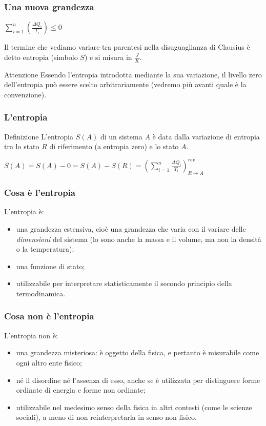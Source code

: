 \documentclass[]{beamer}
\theoremstyle{plain}
\begin{document}
\begin{frame}
  \frametitle{Una nuova grandezza}
  \begin{center}
  $ \sum\limits_{i=1}^n \left( \frac{\Delta Q_i}{T_i} \right) \leq 0 $
  \end{center}
  Il termine che vediamo variare tra parentesi nella disuguaglianza di Clausius è detto \alert<1>{entropia} (simbolo $ S $) e si misura in $ \frac{J}{K} $.{\pause}
  \begin{alertblock}{Attenzione}
  Essendo l'entropia introdotta mediante la sua variazione, il livello zero dell'entropia può essere scelto arbitrariamente (vedremo più avanti quale è la convenzione).    
  \end{alertblock}
\end{frame}

\begin{frame}
  \frametitle{L'entropia}
    \begin{block}{Definizione}
    L'entropia $ S(A) $ di un sistema $ A $ è data dalla variazione di entropia tra lo stato $ R $ di riferimento (a entropia zero) e lo stato $ A $.
    \begin{center}
    $ S(A) = S(A) - 0 = S(A) - S(R) = \left( \sum\limits_{i=1}^n \frac{\Delta Q_i}{T_i}  \right)_{R \rightarrow A}^{rev}  $
    \end{center}
  \end{block}
\end{frame}

\begin{frame}
  \frametitle{Cosa è l'entropia}
  L'entropia è:
  \begin{itemize}
    \item una \alert<1>{grandezza estensiva}, cioè una grandezza che varia con il variare delle \emph{dimensioni} del sistema (lo sono anche la massa e il volume, ma non la densità o la temperatura);\pause
    \item una \alert<2>{funzione di stato};\pause
    \item utilizzabile per \alert<3>{interpretare statisticamente} il secondo principio della termodinamica.
  \end{itemize}
\end{frame}



\begin{frame}
  \frametitle{Cosa non è l'entropia}
  L'entropia non è:
  \begin{itemize}
    \item una \alert<1>{grandezza misteriosa}: è oggetto della fisica, e pertanto è misurabile come ogni altro ente fisico;\pause
    \item né il \alert<2>{disordine} né l'assenza di esso, anche se è utilizzata per distinguere forme ordinate di energia e forme non ordinate;\pause
    \item utilizzabile nel medesimo senso della fisica in \alert<3>{altri contesti} (come le scienze sociali), a meno di non reinterpretarla in senso non fisico.
  \end{itemize}
\end{frame}
\end{document}
